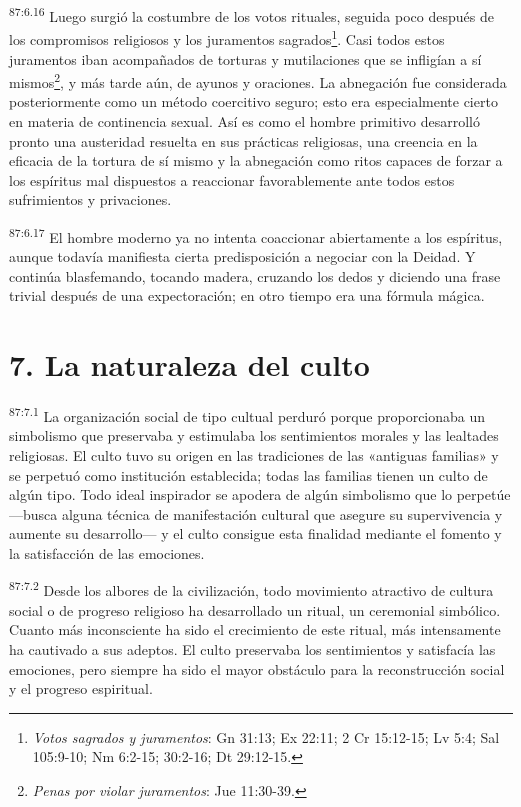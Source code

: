 \par
\textsuperscript{87:6.16} Luego surgió la costumbre de los votos rituales, seguida poco después de los compromisos religiosos y los juramentos sagrados\footnote{\textit{Votos sagrados y juramentos}: Gn 31:13; Ex 22:11; 2 Cr 15:12-15; Lv 5:4; Sal 105:9-10; Nm 6:2-15; 30:2-16; Dt 29:12-15.}. Casi todos estos juramentos iban acompañados de torturas y mutilaciones que se infligían a sí mismos\footnote{\textit{Penas por violar juramentos}: Jue 11:30-39.}, y más tarde aún, de ayunos y oraciones. La abnegación fue considerada posteriormente como un método coercitivo seguro; esto era especialmente cierto en materia de continencia sexual. Así es como el hombre primitivo desarrolló pronto una austeridad resuelta en sus prácticas religiosas, una creencia en la eficacia de la tortura de sí mismo y la abnegación como ritos capaces de forzar a los espíritus mal dispuestos a reaccionar favorablemente ante todos estos sufrimientos y privaciones.

\par
\textsuperscript{87:6.17} El hombre moderno ya no intenta coaccionar abiertamente a los espíritus, aunque todavía manifiesta cierta predisposición a negociar con la Deidad. Y continúa blasfemando, tocando madera, cruzando los dedos y diciendo una frase trivial después de una expectoración; en otro tiempo era una fórmula mágica.

\section*{7. La naturaleza del culto}
\par
\textsuperscript{87:7.1} La organización social de tipo cultual perduró porque proporcionaba un simbolismo que preservaba y estimulaba los sentimientos morales y las lealtades religiosas. El culto tuvo su origen en las tradiciones de las «antiguas familias» y se perpetuó como institución establecida; todas las familias tienen un culto de algún tipo. Todo ideal inspirador se apodera de algún simbolismo que lo perpetúe ---busca alguna técnica de manifestación cultural que asegure su supervivencia y aumente su desarrollo--- y el culto consigue esta finalidad mediante el fomento y la satisfacción de las emociones.

\par
\textsuperscript{87:7.2} Desde los albores de la civilización, todo movimiento atractivo de cultura social o de progreso religioso ha desarrollado un ritual, un ceremonial simbólico. Cuanto más inconsciente ha sido el crecimiento de este ritual, más intensamente ha cautivado a sus adeptos. El culto preservaba los sentimientos y satisfacía las emociones, pero siempre ha sido el mayor obstáculo para la reconstrucción social y el progreso espiritual.


